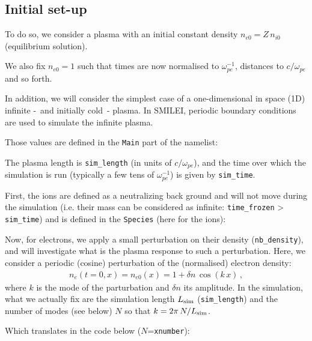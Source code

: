 \documentclass[11pt,a4paper]{article}
\newcommand{\class}[1] {{\color{magenta}\texttt{#1}}}
\newcommand{\code}[1] {{\color{classcolour}\texttt{#1}}}
\newcommand{\param}[1] {{\color{paramcolour}\texttt{#1}}}
\begin{document}
\subsection*{Initial set-up}
To do so, we consider a plasma with an initial  constant density $n_{e0} = Z\,n_{i0}$ (equilibrium solution).

We also fix $n_{e0}=1$ such that times are now normalised to $\omega_{pe}^{-1}$, distances to $c/\omega_{pe}$ and so forth.

In addition, we will consider the simplest case of a one-dimensional in space (1D) infinite -~and initially cold~- plasma.
In SMILEI, periodic boundary conditions are used to simulate the infinite plasma.

Those values are defined in the \class{Main} part of the namelist:


The plasma length is \code{sim\_length}  (in units of $c/\omega_{pe}$), and the time over which the simulation is run (typically a few tens of $\omega_{pe}^{-1}$) is given by \code{sim\_time}. 

First, the ions are defined as a neutralizing back ground and will not move during the simulation (i.e. their mass can be considered as infinite: \code{time\_frozen} > \code{sim\_time}) and is defined in the \class{Species} (here for the ions):


Now, for electrons, we apply a small perturbation on their density (\code{nb\_density}), and will investigate what is the plasma response to such a perturbation.
Here, we consider a periodic (cosine) perturbation of the (normalised) electron density:
\begin{eqnarray}\label{eq_pert}
n_e(t=0,x) = n_{e0}(x) = 1 + \delta n\,\cos(k\,x)\,,
\end{eqnarray}
where $k$ is the mode of the parturbation and $\delta n$ its amplitude. 
In the simulation, what we actually fix are the simulation length $L_{\rm sim}$ (\code{sim\_length}) and the number of modes (see below) $N$ so that $k=2\pi\,N/L_{\rm sim}$.

Which translates in the code below ($N$=\param{xnumber}):

\end{document}
